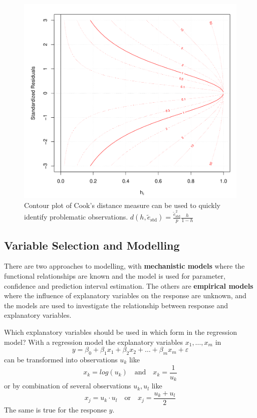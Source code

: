 \documentclass[11pt]{article}
\theoremstyle{definition}
\begin{document}
\begin{figure}[tbh]
	\centering
	\includegraphics[width=0.6\linewidth]{img/cook_distance_contour_plot}
	\caption{Contour plot of Cook's distance measure can be used to quickly identify problematic observations. $d(h, \tilde{e}_{\text{std}}) = \frac{\tilde{e}^2_{\text{std}}}{p}\frac{h}{1-h}$}
	\label{fig:cookdistancecontourplot}
\end{figure}




\subsection{Variable Selection and Modelling}
There are two approaches to modelling, with \textbf{mechanistic models} where the functional relationships are known and the model is used for parameter, confidence and prediction interval estimation. The others are \textbf{empirical models} where the influence of explanatory variables on the response are unknown, and the models are used to investigate the relationship between response and explanatory variables.

Which  explanatory variables should be used in which form in the regression model? With a regression model the explanatory variables $x_1,\dots,x_m$ in
\begin{equation*}
	y = \beta_0 + \beta_1 x_1 + \beta_2 x_2 + \dots + \beta_m x_m + \varepsilon
\end{equation*}
can be transformed into observations $u_k$ like
\begin{equation*}
	x_k = log(u_k) \quad\text{and}\quad x_k = \frac{1}{u_k}
\end{equation*}
or by combination of several observations $u_k, u_l$ like
\begin{equation*}
	x_j = u_k\cdot u_l\quad\text{or}\quad x_j = \frac{u_k + u_l}{2}
\end{equation*}
The same is true for the response $y$.
\end{document}
